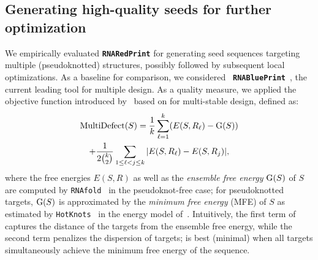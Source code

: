 \documentclass[]{bmcart}
\newcommand{\Def}[1]{\emph{#1}}
\newcommand{\EnsE}{\text{\rm G}} %
\newcommand{\Obj}{\text{\rm MultiDefect}}
\newcommand{\RNAblueprint}{{\tt \bfseries{}\color{black!85} RNA\textcolor{blue!70!black}{Blue}Print}}
\newcommand{\ourprog}{{\tt \bfseries{}\color{black!85}RNA\textcolor{red!70!black}{Red}Print}}
\newcommand{\citep}[1]{\cite{#1}}
\newcommand{\citet}[1]{\cite{#1}}
\newcommand{\revised}[1]{{\color{red} #1}}
\begin{document}
\subsection*{Generating high-quality seeds for further optimization}
We empirically evaluated \ourprog{} for generating seed sequences targeting multiple (pseudoknotted) structures, possibly followed by subsequent local optimizations. As a baseline for comparison, we considered \RNAblueprint~\citep{Hammer2017}, the current leading tool for multiple design.
As a quality measure, we applied the objective function introduced by~\citet{Hammer2017} \revised{based on \cite{Flamm2001,HoenerzuSiederdissen2013}} for multi-stable design, defined as:
\begin{multline}
  \label{eq:blueprintobjective}
    \Obj(S) = \frac{1}{k} \sum_{\ell=1}^{k} (E(S, R_\ell) - \EnsE(S))\\
    +\frac{1}{2\binom{k}{2}} \sum\limits_{1\leq\ell<j\leq k}|E(S,R_\ell) - E(S,R_j)|,
\end{multline}
%
where the free energies $E(S, R)$ as well as the \Def{ensemble free energy} $\EnsE(S)$ of $S$ are computed
by {\tt RNAfold}~\citep{Lorenz2011} in the pseudoknot-free case; for
pseudoknotted targets, $\EnsE(S)$ is approximated by the \Def{minimum
  free energy} (MFE) of $S$ as estimated by {\tt HotKnots}~\citep{Ren2005} in the energy model
of~\citet{dirks-pierce-03}.  Intuitively, the first term of \Obj{}
captures the distance of the targets from the ensemble free energy,
while the second term penalizes the dispersion of targets; \Obj{} is
best (minimal) when all targets simultaneously achieve the minimum
free energy of the sequence.
\end{document}
